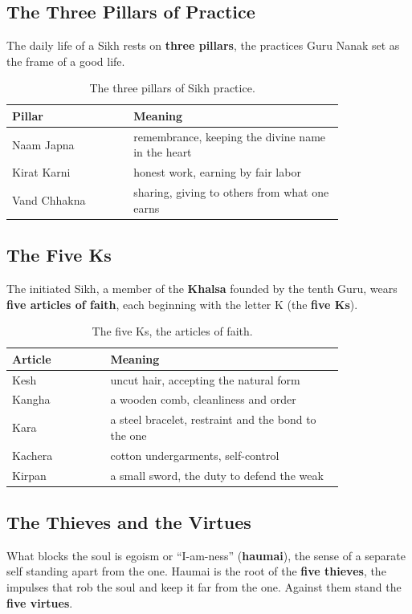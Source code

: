 \subsection{The Three Pillars of Practice}

The daily life of a Sikh rests on \textbf{three pillars}, the practices Guru
Nanak set as the frame of a good life.

\begin{longtable}{L{0.30\linewidth} L{0.52\linewidth}}
\caption{The three pillars of Sikh practice.}\\
\toprule
Pillar & Meaning \\
\midrule
Naam Japna & remembrance, keeping the divine name in the heart \\
Kirat Karni & honest work, earning by fair labor \\
Vand Chhakna & sharing, giving to others from what one earns \\
\bottomrule
\end{longtable}

\subsection{The Five Ks}

The initiated Sikh, a member of the \textbf{Khalsa} founded by the tenth Guru,
wears \textbf{five articles of faith}, each beginning with the letter K (the
\textbf{five Ks}).

\begin{longtable}{L{0.24\linewidth} L{0.58\linewidth}}
\caption{The five Ks, the articles of faith.}\\
\toprule
Article & Meaning \\
\midrule
Kesh & uncut hair, accepting the natural form \\
Kangha & a wooden comb, cleanliness and order \\
Kara & a steel bracelet, restraint and the bond to the one \\
Kachera & cotton undergarments, self-control \\
Kirpan & a small sword, the duty to defend the weak \\
\bottomrule
\end{longtable}

\subsection{The Thieves and the Virtues}

What blocks the soul is egoism or \enquote{I-am-ness} (\textbf{haumai}), the
sense of a separate self standing apart from the one. Haumai is the root of the
\textbf{five thieves}, the impulses that rob the soul and keep it far from the
one. Against them stand the \textbf{five virtues}.


